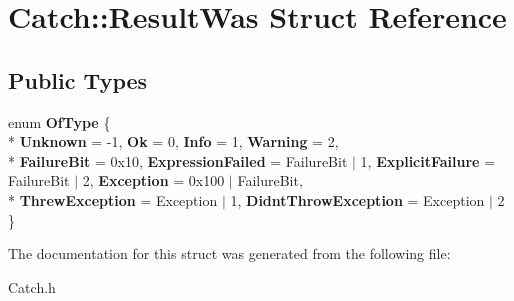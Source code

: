\hypertarget{struct_catch_1_1_result_was}{\section{Catch\-:\-:Result\-Was Struct Reference}
\label{struct_catch_1_1_result_was}
}
\subsection*{Public Types}
\begin{DoxyCompactItemize}
\item 
enum {\bfseries Of\-Type} \{ \\*
{\bfseries Unknown} = -\/1, 
{\bfseries Ok} = 0, 
{\bfseries Info} = 1, 
{\bfseries Warning} = 2, 
\\*
{\bfseries Failure\-Bit} = 0x10, 
{\bfseries Expression\-Failed} = Failure\-Bit $|$ 1, 
{\bfseries Explicit\-Failure} = Failure\-Bit $|$ 2, 
{\bfseries Exception} = 0x100 $|$ Failure\-Bit, 
\\*
{\bfseries Threw\-Exception} = Exception $|$ 1, 
{\bfseries Didnt\-Throw\-Exception} = Exception $|$ 2
 \}
\end{DoxyCompactItemize}


The documentation for this struct was generated from the following file\-:\begin{DoxyCompactItemize}
\item 
Catch.\-h\end{DoxyCompactItemize}
